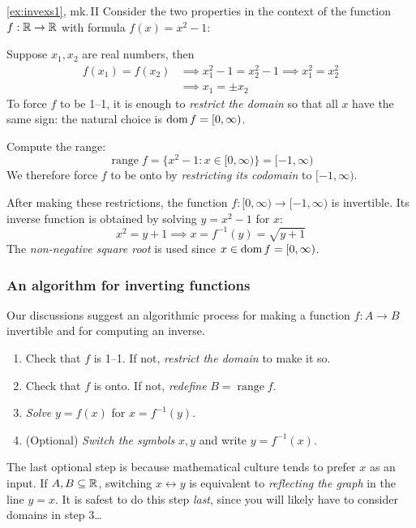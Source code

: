 \begin{example*}{\ref{ex:invexs1}, mk.\,II}{}
	Consider the two properties in the context of the function $f:\mathbb{R}\to\mathbb{R}$ with formula $f(x)=x^2-1$:
	\begin{enumeratea}
		\item Suppose $x_1,x_2$ are real numbers, then 
		\begin{align*}
			f(x_1)=f(x_2)&\implies x_1^2-1=x_2^2-1\implies x_1^2=x_2^2\\
			&\implies x_1=\pm x_2
		\end{align*}
		To force $f$ to be 1--1, it is enough to \emph{restrict the domain} so that all $x$ have the same sign: the natural choice is $\operatorname{dom} f=[0,\infty)$.
		\item Compute the range:
		\[
			\operatorname{range} f=\big\{x^2-1:x\in[0,\infty)\big\}=[-1,\infty)
		\]
		We therefore force $f$ to be onto by \emph{restricting its codomain} to $[-1,\infty)$.
	\end{enumeratea}
	After making these restrictions, the function $f:[0,\infty)\to[-1,\infty)$ is invertible. Its inverse function is obtained by solving $y=x^2-1$ for $x$:
	\[
		x^2=y+1\implies x=f^{-1}(y)=\sqrt{y+1}
	\]
	The \emph{non-negative square root} is used since $x\in\operatorname{dom} f=[0,\infty)$.
\end{example*}



\subsubsection*{An algorithm for inverting functions}

Our discussions suggest an algorithmic process for making a function $f:A\to B$ invertible and for computing an inverse.
\begin{enumerate}
	\item Check that $f$ is 1--1. If not, \emph{restrict the domain} to make it so.
	\item Check that $f$ is onto. If not, \emph{redefine} $B=\operatorname{range} f$.
	\item \emph{Solve} $y=f(x)$ for $x=f^{-1}(y)$.
	\item (Optional) \emph{Switch the symbols} $x,y$ and write $y=f^{-1}(x)$.
\end{enumerate}

The last optional step is because mathematical culture tends to prefer $x$ as an input. If $A,B\subseteq\mathbb{R}$, switching $x\leftrightarrow y$ is equivalent to \emph{reflecting the graph} in the line $y=x$. It is safest to do this step \emph{last}, since you will likely have to consider domains in step 3\ldots\smallbreak


